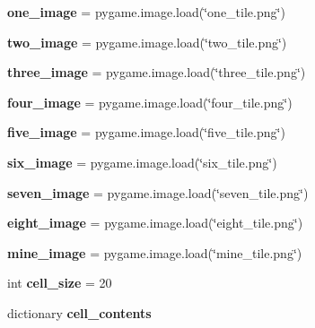 \begin{DoxyCompactItemize}
{\bfseries one\+\_\+image} = pygame.\+image.\+load(\char`\"{}one\+\_\+tile.\+png\char`\"{})
\item 
\mbox{\label{namespacesweeper___u_i_ac8852c0b349e5d2a50c7834891447d5c}} 
{\bfseries two\+\_\+image} = pygame.\+image.\+load(\char`\"{}two\+\_\+tile.\+png\char`\"{})
\item 
\mbox{\label{namespacesweeper___u_i_a686e818a88ca91326ca3cf106516ea17}} 
{\bfseries three\+\_\+image} = pygame.\+image.\+load(\char`\"{}three\+\_\+tile.\+png\char`\"{})
\item 
\mbox{\label{namespacesweeper___u_i_ae8187ea44aca6a2b1ac3c4a404bc896f}} 
{\bfseries four\+\_\+image} = pygame.\+image.\+load(\char`\"{}four\+\_\+tile.\+png\char`\"{})
\item 
\mbox{\label{namespacesweeper___u_i_a4a92de7606a208a674a1eb410d93d566}} 
{\bfseries five\+\_\+image} = pygame.\+image.\+load(\char`\"{}five\+\_\+tile.\+png\char`\"{})
\item 
\mbox{\label{namespacesweeper___u_i_a16936d9074cd118b2b16eb0732bfaa63}} 
{\bfseries six\+\_\+image} = pygame.\+image.\+load(\char`\"{}six\+\_\+tile.\+png\char`\"{})
\item 
\mbox{\label{namespacesweeper___u_i_afb69503b548d0bfa13d88190257a870a}} 
{\bfseries seven\+\_\+image} = pygame.\+image.\+load(\char`\"{}seven\+\_\+tile.\+png\char`\"{})
\item 
\mbox{\label{namespacesweeper___u_i_a03f55d6e44aa2274710db9b0e8fce802}} 
{\bfseries eight\+\_\+image} = pygame.\+image.\+load(\char`\"{}eight\+\_\+tile.\+png\char`\"{})
\item 
\mbox{\label{namespacesweeper___u_i_aa5e3b4f4a9704288a7d0e310dfe45e28}} 
{\bfseries mine\+\_\+image} = pygame.\+image.\+load(\char`\"{}mine\+\_\+tile.\+png\char`\"{})
\item 
\mbox{\label{namespacesweeper___u_i_aec495a6edf2be23cabf9eb2f8d1ae537}} 
int {\bfseries cell\+\_\+size} = 20
\item 
dictionary {\bfseries cell\+\_\+contents}
\end{DoxyCompactItemize}


